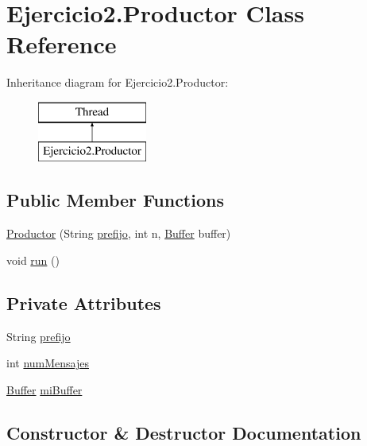 \hypertarget{class_ejercicio2_1_1_productor}{}\section{Ejercicio2.\+Productor Class Reference}
\label{class_ejercicio2_1_1_productor}
Inheritance diagram for Ejercicio2.\+Productor\+:\begin{figure}[H]
\begin{center}
\leavevmode
\includegraphics[height=2.000000cm]{class_ejercicio2_1_1_productor}
\end{center}
\end{figure}
\subsection*{Public Member Functions}
\begin{DoxyCompactItemize}
\item 
\mbox{\hyperlink{class_ejercicio2_1_1_productor_a4d38b0aa19b1a633398d7ddd4e53abca}{Productor}} (String \mbox{\hyperlink{class_ejercicio2_1_1_productor_a7afbe84dee1488cfae3b8555281a4e3f}{prefijo}}, int n, \mbox{\hyperlink{class_ejercicio2_1_1_buffer}{Buffer}} buffer)
\item 
void \mbox{\hyperlink{class_ejercicio2_1_1_productor_a326c43803b7561976965faf07ccb0788}{run}} ()
\end{DoxyCompactItemize}
\subsection*{Private Attributes}
\begin{DoxyCompactItemize}
\item 
String \mbox{\hyperlink{class_ejercicio2_1_1_productor_a7afbe84dee1488cfae3b8555281a4e3f}{prefijo}}
\item 
int \mbox{\hyperlink{class_ejercicio2_1_1_productor_aa0ad1c460b23e61a4f67420e0ab5f7fa}{num\+Mensajes}}
\item 
\mbox{\hyperlink{class_ejercicio2_1_1_buffer}{Buffer}} \mbox{\hyperlink{class_ejercicio2_1_1_productor_a0321b6e81e1f2486ca097a1f36de7952}{mi\+Buffer}}
\end{DoxyCompactItemize}


\subsection{Constructor \& Destructor Documentation}
\mbox{\label{class_ejercicio2_1_1_productor_a4d38b0aa19b1a633398d7ddd4e53abca}} 
